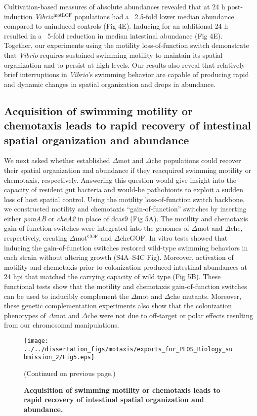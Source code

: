 {{{{Cultivation-based measures of absolute abundances revealed that at 24 h post-induction \textit{Vibrio}$^{\text{motLOF}}$ populations had a ~2.5-fold lower median abundance compared to uninduced controls (Fig 4E). Inducing for an additional 24 h resulted in a ~5-fold reduction in median intestinal abundance (Fig 4E). Together, our experiments using the motility loss-of-function switch demonstrate that \textit{Vibrio} requires sustained swimming motility to maintain its spatial organization and to persist at high levels. Our results also reveal that relatively brief interruptions in \textit{Vibrio}'s swimming behavior are capable of producing rapid and dynamic changes in spatial organization and drops in abundance.


\subsection{Acquisition of swimming motility or chemotaxis leads to rapid recovery of intestinal spatial organization and abundance}
We next asked whether established $\Delta$mot and $\Delta$che populations could recover their spatial organization and abundance if they reacquired swimming motility or chemotaxis, respectively. Answering this question would give insight into the capacity of resident gut bacteria and would-be pathobionts to exploit a sudden loss of host spatial control. Using the motility loss-of-function switch backbone, we constructed motility and chemotaxis ``gain-of-function'' switches by inserting either \textit{pomAB} or \textit{cheA2} in place of dcas9 (Fig 5A). The motility and chemotaxis gain-of-function switches were integrated into the genomes of $\Delta$mot and $\Delta$che, respectively, creating $\Delta$mot$^{\text{GOF}}$ and $\Delta$cheGOF. In vitro tests showed that inducing the gain-of-function switches restored wild-type swimming behaviors in each strain without altering growth (S4A–S4C Fig). Moreover, activation of motility and chemotaxis prior to colonization produced intestinal abundances at 24 hpi that matched the carrying capacity of wild type (Fig 5B). These functional tests show that the motility and chemotaxis gain-of-function switches can be used to inducibly complement the $\Delta$mot and $\Delta$che mutants. Moreover, these genetic complementation experiments also show that the colonization phenotypes of $\Delta$mot and $\Delta$che were not due to off-target or polar effects resulting from our chromosomal manipulations.

\begin{figure}%
	\centerline{
		\texttt{[image: ../../dissertation\_figs/motaxis/exports\_for\_PLOS\_Biology\_submission\_2/Fig5.eps]}}
	\caption{\textbf{Acquisition of swimming motility or chemotaxis leads to rapid recovery of intestinal spatial organization and abundance.}}{(Continued on previous page.)}
	\label{fig:motaxis_fig5}
\end{figure}

}}}}
